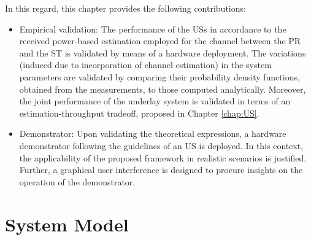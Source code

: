 In this regard, this chapter provides the following contributions:
\begin{itemize}
	\item {}Empirical validation: The performance of the USs in accordance to the received power-based estimation employed for the channel between the PR and the ST is validated by means of a hardware deployment. The variations (induced due to incorporation of channel estimation) in the system parameters are validated by comparing their probability density functions, obtained from the measurements, to those computed analytically. Moreover, the joint performance of the underlay system is validated in terms of an estimation-throughput tradeoff, proposed in Chapter \ref{chap:US}. %
	\item Demonstrator: Upon validating the theoretical expressions, a hardware demonstrator following the guidelines of an US is deployed. In this context, the applicability of the proposed framework in realistic scenarios is justified. Further, a graphical user interference is designed to procure insights on the operation of the demonstrator.	
\end{itemize}



\section{System Model}
\label{sysmod}

